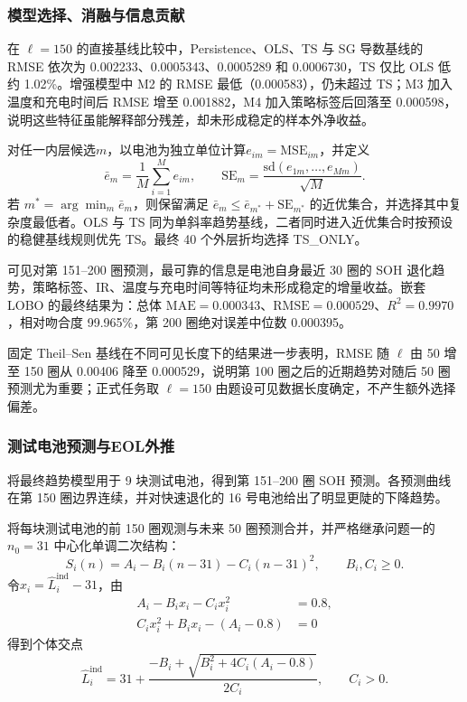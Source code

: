 \documentclass[withoutpreface]{cumcmthesis}
\newcommand{\RMSE}{\mathrm{RMSE}}
\newcommand{\MAE}{\mathrm{MAE}}
\begin{document}
\subsubsection{模型选择、消融与信息贡献}

在 $\ell=150$ 的直接基线比较中，Persistence、OLS、TS 与 SG 导数基线的 RMSE 依次为 0.002233、0.0005343、0.0005289 和 0.0006730，TS 仅比 OLS 低约 1.02\%。增强模型中 M2 的 RMSE 最低（0.000583），仍未超过 TS；M3 加入温度和充电时间后 RMSE 增至 0.001882，M4 加入策略标签后回落至 0.000598，说明这些特征虽能解释部分残差，却未形成稳定的样本外净收益。

对任一内层候选$m$，以电池为独立单位计算$e_{im}=\mathrm{MSE}_{im}$，并定义
\begin{equation}
\bar e_m=\frac1M\sum_{i=1}^{M}e_{im},
\qquad
\mathrm{SE}_m=\frac{\mathrm{sd}(e_{1m},\ldots,e_{Mm})}{\sqrt M}.
\end{equation}
若 $m^*=\arg\min_m\bar e_m$，则保留满足 $\bar e_m\le\bar e_{m^*}+\mathrm{SE}_{m^*}$ 的近优集合，并选择其中复杂度最低者。OLS 与 TS 同为单斜率趋势基线，二者同时进入近优集合时按预设的稳健基线规则优先 TS。最终 40 个外层折均选择 TS\_ONLY。

可见对第 151--200 圈预测，最可靠的信息是电池自身最近 30 圈的 SOH 退化趋势，策略标签、IR、温度与充电时间等特征均未形成稳定的增量收益。嵌套 LOBO 的最终结果为：总体 $\MAE=0.000343$、$\RMSE=0.000529$、$R^2=0.9970$，相对吻合度 99.965\%，第 200 圈绝对误差中位数 0.000395。

固定 Theil--Sen 基线在不同可见长度下的结果进一步表明，RMSE 随 $\ell$ 由 50 增至 150 圈从 0.00406 降至 0.000529，说明第 100 圈之后的近期趋势对随后 50 圈预测尤为重要；正式任务取 $\ell=150$ 由题设可见数据长度确定，不产生额外选择偏差。

\subsubsection{测试电池预测与EOL外推}

将最终趋势模型用于 9 块测试电池，得到第 151--200 圈 SOH 预测。各预测曲线在第 150 圈边界连续，并对快速退化的 16 号电池给出了明显更陡的下降趋势。

将每块测试电池的前 150 圈观测与未来 50 圈预测合并，并严格继承问题一的 $n_0=31$ 中心化单调二次结构：
\begin{equation}
S_i(n)=A_i-B_i(n-31)-C_i(n-31)^2,\qquad B_i,C_i\ge0.
\end{equation}
令$x_i=\widehat L_i^{\mathrm{ind}}-31$，由
\begin{align}
A_i-B_ix_i-C_ix_i^2&=0.8,\\
C_ix_i^2+B_ix_i-(A_i-0.8)&=0
\end{align}
得到个体交点
\begin{equation}
\widehat L_i^{\mathrm{ind}}=31+
\frac{-B_i+\sqrt{B_i^2+4C_i(A_i-0.8)}}{2C_i},\qquad C_i>0.
\end{equation}
\end{document}

